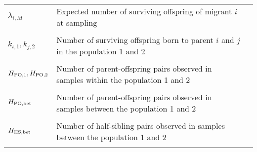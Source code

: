 \documentclass[12pt, English]{article}
\begin{document}
\begin{spacing}{1.9}
\begin{table}[tb]
\begin{center}
\begin{tabular}{llc}
	$\lambda_{i, M}$					& Expected number of surviving offspring of migrant $i$ at sampling\\
		                						& \\
	$k_{i,1}, k_{j,2}$					& Number of surviving offspring born to parent $i$ and $j$ in the population 1 and 2\\ 
	                							& \\
	$H_{\rm PO, 1}, H_{\rm PO, 2}$		& Number of parent-offspring pairs observed in samples within the population 1 and 2\\ 
	                							& \\
	$H_{\rm PO, bet}$					& Number of parent-offspring pairs observed in samples between the population 1 and 2\\ 
	                							& \\
	$H_{\rm HS, bet}$					& Number of half-sibling pairs observed in samples between the population 1 and 2\\ 
	                							& \\              		
	\hline
    \end{tabular}
    \label{symbols} 
\end{center} 
\end{table}
\renewcommand{\arraystretch}{1}

\clearpage

\newcommand{\figcapa}{Example of relationships between mothers and their offspring number. The open, gray, and filled circles represent mothers, their eggs, and their offspring, respectively. The area of an open circle indicates the degree of reproductive potential of each mother (i.e., $\lambda_i$). The dotted and thin arrows denote mother--egg and egg--offspring relationships, respectively. The symbol x denotes a failure to survive at sampling. Sampled individuals are denoted with squares. Input parameters in this example: $n_{\rm P, 1}=4$, $n_{\rm P, 2}=4$, $n_{\rm O, 1}=4$, $n_{\rm O, 2}=4$, $N_{1}=16$, $N_{2}=14$, and $M=6$. The numbers of kinship pairs: $H_{\rm PO, 1}=1$, $H_{\rm PO, 2}=1$, $H_{\rm PO, bet}=1$, and $H_{\rm HS, bet}=2$.}

\newcommand{\figcapb}{Violin plots showing the distribution of relative bias in our estimator (Eq.~\ref{NeN_hat2}) for various values of $c$ and sample size. Filled circles represent the mean values. Sample sizes for mothers and offspring are identical (i.e., $n=n_{\rm M} = n_{\rm O}$) and indicated in the legend. For the demonstration purposes, the distribution is truncated, although the mean values are calculated including the truncated values. (a) $N_{\rm m}=1{,}000$, (b) $N_{\rm m}=10{,}000$.}


\end{spacing}
\end{document}
